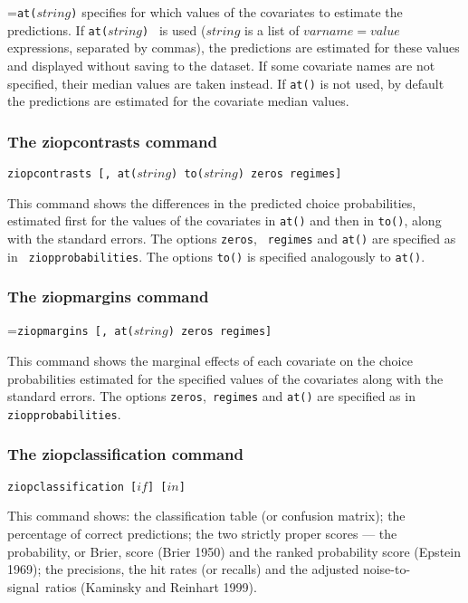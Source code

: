 \documentclass[letterpaper,fleqn,12pt]{article}
\begin{document}
\hangindent=\parindent\noindent \texttt{at($string$)} specifies for which
values of the covariates to estimate the predictions. If \texttt{at($string$)%
} is used (\texttt{$string$} is a list of \texttt{$varname=value$}
expressions, separated by commas), the predictions are estimated for these
values and displayed without saving to the dataset. If some covariate names
are not specified, their median values are taken instead. If \texttt{at()}
is not used, by default the predictions are estimated for the covariate
median values.

\subsubsection*{The ziopcontrasts command}

\texttt{ziopcontrasts [, at($string$) to($string$) zeros regimes] }

\smallskip

This command shows the differences in the predicted choice probabilities,
estimated first for the values of the covariates in \texttt{at()} and then
in \texttt{to()}, along with the standard errors. The options \texttt{zeros},%
\texttt{\ regimes} and \texttt{at()} are specified as in \texttt{%
ziopprobabilities}. The options \texttt{to()} is specified analogously to 
\texttt{at()}.

\subsubsection*{The ziopmargins command}

\hangindent=\parindent\noindent \texttt{ziopmargins [, at($string$) zeros
regimes]}

\smallskip

This command shows the marginal effects of each covariate on the choice
probabilities estimated for the specified values of the covariates along
with the standard errors. The options \texttt{zeros},\texttt{\ regimes} and 
\texttt{at()} are specified as in \texttt{ziopprobabilities}.

\subsubsection*{The ziopclassification command}

\texttt{ziopclassification [$if$] [$in$]}

\smallskip

This command shows: the classification table (or confusion matrix); the
percentage of correct predictions; the two strictly proper scores --- the
probability, or Brier, score (Brier 1950) and the ranked probability score
(Epstein 1969); the precisions, the hit rates (or recalls) and the adjusted
noise-to-signal\ ratios (Kaminsky and Reinhart 1999).
\end{document}
